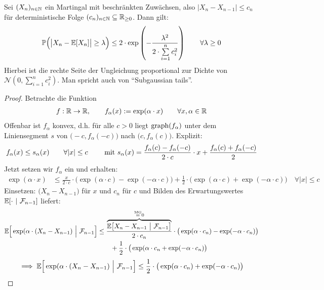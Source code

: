 \begin{theorem}\label{theorem5.4AzumasUngleichung}\enter
Sei $(X_n)_{n\in\N}$ ein Martingal mit beschränkten Zuwächsen, also $\big|X_n-X_{n-1}\big|\leq c_n$ für deterministische Folge $(c_n)_{n\in\N}\subseteq\R_{\geq0}$. Dann gilt:
\begin{align*}
\P\Big(\big|X_n-\E[X_n]\big|\geq\lambda\Big)\leq2\cdot\exp\left(-\frac{\lambda^2}{2\cdot\sum\limits_{i=1}^n c_i^2}\right)\qquad\forall\lambda\geq0
\end{align*}
Hierbei ist die rechte Seite der Ungleichung proportional zur Dichte von $\mathcal{N}\left(0,\sum\limits_{i=1}^n c_i^2\right)$. Man spricht auch von ``Subgaussian tails''.
\end{theorem}
\begin{proof}
Betrachte die Funktion
\begin{align*}
f:\R\to\R,\qquad f_\alpha(x):=\exp(\alpha\cdot x)\qquad\forall x,\alpha\in\R
\end{align*}
Offenbar ist $f_\alpha$ konvex, d.h. für alle $c>0$ liegt $\graph(f_\alpha)$ unter dem Liniensegment $s$ von $\big(-c,f_\alpha(-c)\big)$ nach $\big(c,f_\alpha(c)\big)$. Explizit:
\begin{align*}
f_\alpha(x)\leq s_\alpha(x)\qquad\forall |x|\leq c\qquad\mit s_\alpha(x)=\frac{f_\alpha(c)-f_\alpha(-c)}{2\cdot c}\cdot x+\frac{f_\alpha(c)+f_\alpha(-c)}{2}
\end{align*}
Jetzt setzen wir $f_\alpha$ ein und erhalten:
\begin{align*}
\exp(\alpha\cdot x)
&\leq\frac{x}{2\cdot c}\cdot\big(\exp(\alpha\cdot c)-\exp(-\alpha\cdot c)\big)+\frac{1}{2}\cdot\big(\exp(\alpha\cdot c)+\exp(-\alpha\cdot c)\big)\quad\forall |x|\leq c
\end{align*}
Einsetzen: $\big(X_n-X_{n-1}\big)$ für $x$ und $c_n$ für $c$ und Bilden des Erwartungswertes $\E[\cdot~|~\F_{n-1}]$ liefert:
\begin{align*}
\E\Big[\exp(\alpha\cdot(X_n-X_{n-1})~\Big|~\F_{n-1}\Big]
&\leq
\frac{\overbrace{\E\big[X_n-X_{n-1}~\big|~\F_{n-1}\big]}^{\stackeq{\text{MG}}0}}{2\cdot c_n}\cdot\big(\exp(\alpha\cdot c_n)-\exp(-\alpha\cdot c_n)\big)\\
&\qquad+\frac{1}{2}\cdot\big(\exp(\alpha\cdot c_n+\exp(-\alpha\cdot c_n)\big)
\end{align*}
\begin{align*}
\implies
\E\Big[\exp(\alpha\cdot(X_n-X_{n-1})~\Big|~\F_{n-1}\Big]
&\leq \frac{1}{2}\cdot\big(\exp(\alpha\cdot c_n)+\exp(-\alpha\cdot c_n)\big)\\

\end{align*}
\end{proof}
